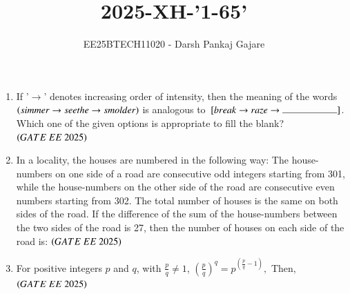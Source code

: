 \documentclass[journal,12pt,onecolumn]{IEEEtran}
\theoremstyle{remark}
\begin{document}
\title{2025-XH-'1-65'}
\author{EE25BTECH11020 - Darsh Pankaj Gajare}
\maketitle
\begin{enumerate}

\item If '$\rightarrow $' denotes increasing order of intensity, then the meaning of the words $\left(simmer \rightarrow  seethe \rightarrow  smolder\right)$ is analogous to $\sbrak{break \rightarrow  raze \rightarrow  \rule{2cm}{0.4pt} }$. Which one of the given options is appropriate to fill the blank? 
\hfill $\brak{GATE\ EE\ 2025}$
    \begin{enumerate}
  \end{enumerate}
   \item In a locality, the houses are numbered in the following way:
The house-numbers on one side of a road are consecutive odd integers starting from 301, while the house-numbers on the other side of the road are consecutive even numbers starting from 302. The total number of houses is the same on both sides of the road.
If the difference of the sum of the house-numbers between the two sides of the road is 27, then the number of houses on each side of the road is: 
   \hfill $\brak{GATE\ EE\ 2025}$
       \begin{enumerate}
  \end{enumerate}
   \item For positive integers $ p $ and $ q $, with $ \frac{p}{q} \neq 1 $, 
$\left( \frac{p}{q} \right)^q = p^{\left( \frac{p}{q} - 1 \right)},$
Then,
\hfill $\brak{GATE\ EE\ 2025}$
    \begin{enumerate}
\end{enumerate}
\end{enumerate}
\end{document}

